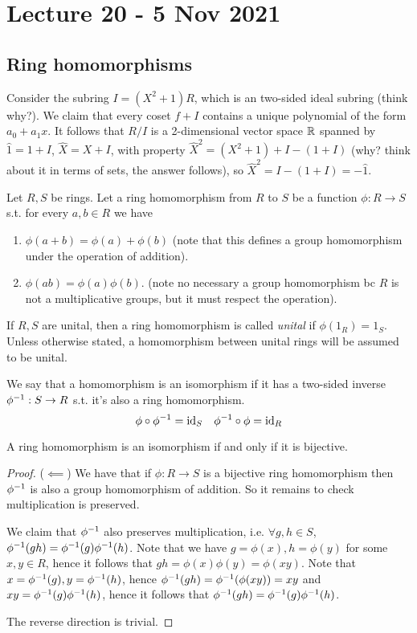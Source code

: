 \section{Lecture 20 - 5 Nov 2021}
\subsection{Ring homomorphisms}
\begin{example}
  Consider the subring $I=(X^2+1)R$, which is an two-sided ideal subring (think why?). We
  claim that every coset $f+I$ contains a unique polynomial of the form $a_0+a_1x$. It
  follows that $R/I$ is a 2-dimensional vector space $\mathbb R$ spanned by $\hat{1}=1+I$,
  $\hat{X}=X+I$, with property $\hat{X}^2=(X^2+1)+I - (1+I)$ (why? think about it in terms
  of sets, the answer follows), so $\hat{X}^2=I-(1+I)= -\hat{1}$.
\end{example}

\begin{definition}
  Let $R,S$ be rings. Let a ring homomorphism from $R$ to $S$ be a function $\phi:R\to S$
  s.t. for every $a,b\in R$ we have 
  \begin{enumerate}
    \item $\phi(a+b)=\phi(a)+\phi(b)$ (note that this defines a group homomorphism under
      the operation of addition).
    \item $\phi(ab)=\phi(a)\phi(b)$. (note no necessary a group homomorphism bc $R$ is not
      a multiplicative groups, but it must respect the operation).
  \end{enumerate}
  If $R,S$ are unital, then a ring homomorphism is called \emph{unital} if
  $\phi(1_R)=1_S$. Unless otherwise stated, a homomorphism between unital rings will be
  assumed to be unital.

  We say that a homomorphism is an isomorphism if it has a two-sided inverse
  $\phi^{-1}:S\to R$ s.t. it's also a ring homomorphism. 
  \[\phi \circ \phi^{-1} = \mathrm{id}_S \quad \phi^{-1}\circ\phi = \mathrm{id}_R\]
  \label{def:ringHomUnital}
\end{definition}

\begin{theorem}
  A ring homomorphism is an isomorphism if and only if it is bijective.
  \label{<+label+>}
\end{theorem}
\begin{proof}
  ($\impliedby$) We have that if $\phi:R\to S$ is a bijective ring homomorphism then $\phi^{-1}$ is also a group
  homomorphism of addition. So it remains to check multiplication is preserved.

  We claim that $\phi^{-1}$ also preserves multiplication, i.e.
  $\forall g,h\in S$, $\phi^{-1}(gh)=\phi^{-1}(g)\phi^{-1}(h)$. Note that we have
  $g=\phi(x),h=\phi(y)$ for some $x,y\in R$, hence it follows that
  $gh=\phi(x)\phi(y)=\phi(xy)$. Note that $x=\phi^{-1}(g),y=\phi^{-1}(h)$, hence
  $\phi^{-1}(gh)=\phi^{-1}(\phi(xy))=xy$ and $xy=\phi^{-1}(g)\phi^{-1}(h)$, hence it follows
  that $\phi^{-1}(gh)=\phi^{-1}(g)\phi^{-1}(h)$.

  The reverse direction is trivial. 
\end{proof}


